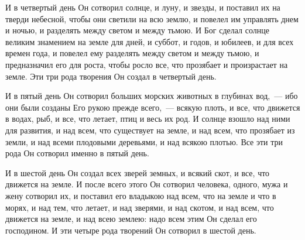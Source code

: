 И в четвертый день Он сотворил солнце, и луну, и звезды, и поставил их на
тверди небесной, чтобы они светили на всю землю, и повелел им управлять днем и
ночью, и разделять между светом и между тьмою. И Бог сделал солнце великим
знамением на земле для дней, и суббот, и годов, и юбилеев, и для всех времен
года, и повелел ему разделять между светом и между тьмою, и
предназначил его для роста, чтобы росло все, что прозябает и
произрастает на земле. Эти три рода творения Он создал в четвертый
день.

И в пятый день Он сотворил больших морских животных в глубинах вод,~---
ибо они были созданы Его рукою прежде всего,~--- всякую плоть, и все, что
движется в водах, рыб, и все, что летает, птиц и весь их род. И солнце взошло
над ними для развития, и над всем, что существует на земле, и над всем, что
прозябает из земли, и над всеми плодовыми деревьями, и над всякою плотью. Все
эти три рода Он сотворил именно в пятый день.

И в шестой день Он создал всех зверей земных, и всякий скот, и все, что
движется на земле. И после всего этого Он сотворил человека, одного, мужа и
жену сотворил их, и поставил его владыкою над всем, что на земле и что в морях,
и над тем, что летает, и над зверями, и над скотом, и над всем, что движется на
земле, и над всею землею: надо всем этим Он сделал его господином. И эти четыре
рода творений Он сотворил в шестой день.

